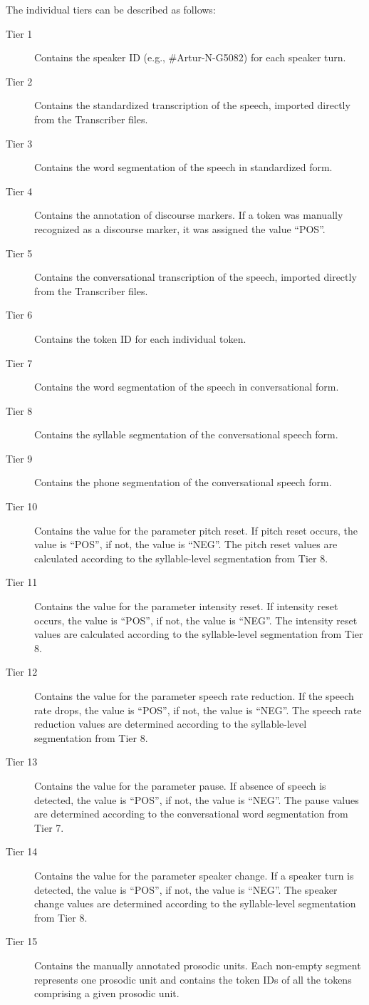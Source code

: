 \documentclass[a4paper,oneside,12pt]{article}
\begin{document}
The individual tiers can be described as follows:
\begin{description}
  \item[Tier 1]	Contains the speaker ID (e.g., \#Artur-N-G5082) for each speaker
    turn.
  \item[Tier 2]	Contains the standardized transcription of the speech, imported
    directly from the Transcriber files.
  \item[Tier 3]	Contains the word segmentation of the speech in standardized
    form.
  \item[Tier 4]	Contains the annotation of discourse markers. If a token was
    manually recognized as a discourse marker, it was assigned the value “POS”.
  \item[Tier 5]	Contains the conversational transcription of the speech,
    imported directly from the Transcriber files.
  \item[Tier 6]	Contains the token ID for each individual token.
  \item[Tier 7]	Contains the word segmentation of the speech in conversational
    form.
  \item[Tier 8]	Contains the syllable segmentation of the conversational speech
    form.
  \item[Tier 9] Contains the phone segmentation of the conversational speech
    form.
  \item[Tier 10]	Contains the value for the parameter pitch reset. If pitch
    reset occurs, the value is ``POS'', if not, the value is ``NEG''. The pitch
    reset values are calculated according to the syllable-level segmentation
    from Tier 8.
  \item[Tier 11]	Contains the value for the parameter intensity reset. If
    intensity reset occurs, the value is ``POS'', if not, the value is ``NEG''.
    The intensity reset values are calculated according to the syllable-level
    segmentation from Tier 8.
  \item[Tier 12]	Contains the value for the parameter speech rate reduction. If
    the speech rate drops, the value is ``POS'', if not, the value is ``NEG''.
    The speech rate reduction values are determined according to the
    syllable-level segmentation from Tier 8.
  \item[Tier 13]	Contains the value for the parameter pause. If absence of
    speech is detected, the value is ``POS'', if not, the value is ``NEG''.  The
    pause values are determined according to the conversational word
    segmentation from Tier 7.
  \item[Tier 14]	Contains the value for the parameter speaker change. If a
    speaker turn is detected,  the value is ``POS'', if not, the value is
    ``NEG''. The speaker change values are determined according to the
    syllable-level segmentation from Tier 8.
  \item[Tier 15]	Contains the manually annotated prosodic units. Each non-empty
    segment represents one prosodic unit and contains the token IDs of all the
    tokens comprising a given prosodic unit.
\end{description}



\end{document}
